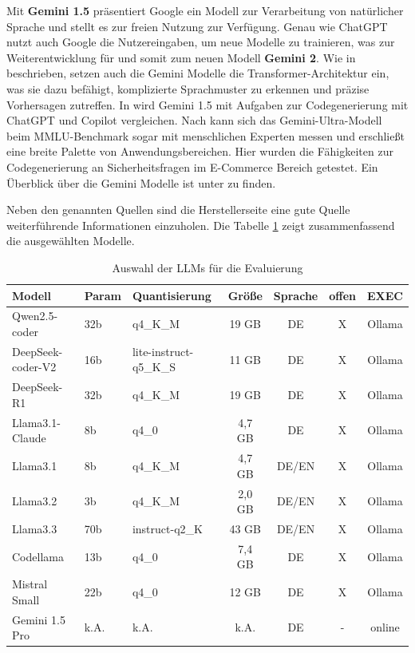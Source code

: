 Mit \textbf{Gemini 1.5} präsentiert Google ein Modell zur Verarbeitung von natürlicher Sprache und stellt es zur freien Nutzung zur Verfügung. Genau wie ChatGPT nutzt auch Google die Nutzereingaben, um neue Modelle zu trainieren, was zur Weiterentwicklung für und somit zum neuen Modell \textbf{Gemini 2}. Wie in \cite{siam-2024} beschrieben, setzen auch die Gemini Modelle die Transformer-Architektur ein, was sie dazu befähigt, komplizierte Sprachmuster zu erkennen und präzise Vorhersagen zutreffen. In \cite{siam-2024} wird Gemini 1.5 mit Aufgaben zur Codegenerierung mit ChatGPT und Copilot vergleichen. Nach \cite{elgedawy-2024} kann sich das Gemini-Ultra-Modell beim MMLU-Benchmark sogar mit menschlichen Experten messen und erschließt eine breite Palette von Anwendungsbereichen. Hier wurden die Fähigkeiten zur Codegenerierung an Sicherheitsfragen im E-Commerce Bereich getestet. Ein Überblick über die Gemini Modelle ist unter \cite{google_gemini_model_overview} zu finden.\vspace{0.2cm}

Neben den genannten Quellen sind die Herstellerseite eine gute Quelle weiterführende Informationen einzuholen. Die Tabelle \ref{tab:selected_llms} zeigt zusammenfassend die ausgewählten Modelle.\vspace{0.2cm}

\begin{table}[!ht]
	\begin{tabular}{|l|l|l|c|c|c|c|}
		\hline
		\textbf{Modell} & \textbf{Param} & \textbf{Quantisierung} & \textbf{Größe} & \textbf{Sprache} & \textbf{offen} & \textbf{EXEC} \\
		\hline
		Qwen2.5-coder     & 32b &               q4\_K\_M &  19 GB &    DE & X & Ollama \\
		DeepSeek-coder-V2 & 16b & lite-instruct-q5\_K\_S &  11 GB &    DE & X & Ollama \\
		DeepSeek-R1       & 32b &               q4\_K\_M &  19 GB &    DE & X & Ollama \\
		Llama3.1-Claude   &  8b &                  q4\_0 & 4,7 GB &    DE & X & Ollama \\
		Llama3.1          &  8b &               q4\_K\_M & 4,7 GB & DE/EN & X & Ollama \\
		Llama3.2          &  3b &               q4\_K\_M & 2,0 GB & DE/EN & X & Ollama \\
		Llama3.3          & 70b &         instruct-q2\_K &  43 GB & DE/EN & X & Ollama \\
		Codellama         & 13b &                  q4\_0 & 7,4 GB &    DE & X & Ollama \\
		Mistral Small     & 22b &                  q4\_0 &  12 GB &    DE & X & Ollama \\
		Gemini 1.5 Pro    &k.A. &                   k.A. &   k.A. &    DE & - & online \\
		\hline
		\hline
	\end{tabular}
	\caption{Auswahl der LLMs für die Evaluierung}
	\label{tab:selected_llms}
\end{table}

